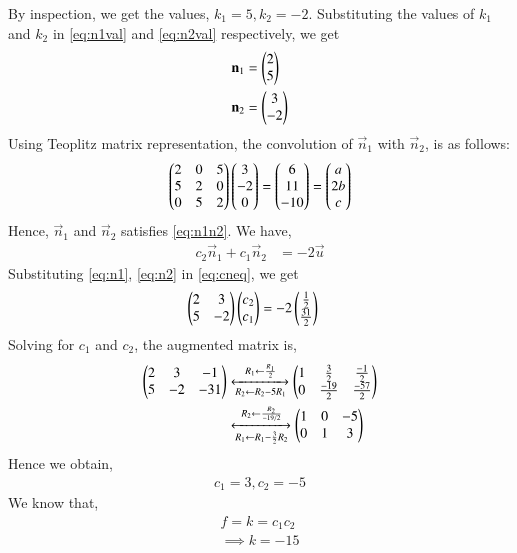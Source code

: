 \documentclass[journal,12pt,twocolumn]{IEEEtran}
\begin{document}
By inspection, we get the values, $k_1 = 5, k_2 = -2$. Substituting the values of $k_1$ and $k_2$ in \eqref{eq:n1val} and \eqref{eq:n2val} respectively, we get
\begin{align}
	\mathbf{n}_1 &= \begin{pmatrix}2 \\ 5\end{pmatrix} \label{eq:n1}\\
	\mathbf{n}_2 &= \begin{pmatrix}3 \\ -2\end{pmatrix} \label{eq:n2}
\end{align}
Using Teoplitz matrix representation, the convolution of $\vec{n}_1$ with $\vec{n}_2$, is as follows:
\begin{align}
	\begin{pmatrix}2 & 0 & 5\\ 5 & 2 & 0\\ 0 & 5 & 2\end{pmatrix}\begin{pmatrix}3\\-2\\0\end{pmatrix} = \begin{pmatrix}6 \\11 \\ -10\end{pmatrix} = \begin{pmatrix}a \\ 2b \\ c\end{pmatrix}
\end{align}
Hence, $\vec{n}_1$ and $\vec{n}_2$ satisfies \eqref{eq:n1n2}.
We have,
\begin{align}
	c_2\vec{n}_1 + c_1\vec{n}_2 &= -2\vec{u} \label{eq:cneq}
\end{align}
Substituting \eqref{eq:n1}, \eqref{eq:n2} in \eqref{eq:cneq}, we get
\begin{align}
 \begin{pmatrix}2 & 3\\ 5 & -2\end{pmatrix}\begin{pmatrix}c_2 \\ c_1\end{pmatrix} &= -2\begin{pmatrix}\frac{1}{2} \\ \frac{31}{2}\end{pmatrix}
\end{align}
Solving for $c_1$ and $c_2$, the augmented matrix is,
\begin{align}
	\begin{pmatrix}2 & 3 & -1\\ 5 & -2 & -31\end{pmatrix} &\xleftrightarrow[R_2 \leftarrow R_2 - 5R_1]{R_1 \leftarrow \frac{R_1}{2}} \begin{pmatrix}1 & \frac{3}{2}  & \frac{-1}{2} \\ 0 & \frac{-19}{2} & \frac{-57}{2}\end{pmatrix} \\
	&\xleftrightarrow[R_1 \leftarrow R_1 - \frac{3}{2}R_2]{R_2 \leftarrow \frac{R_2}{-19/2}} \begin{pmatrix}1 & 0 & -5\\0 & 1 & 3\end{pmatrix}
\end{align}
Hence we obtain,
\begin{align}
	c_1 = 3, c_2 = -5
\end{align}
We know that,
\begin{align}
	f = k = c_1c_2\\
	\implies \boxed{k = -15}
\end{align}
\end{document}
